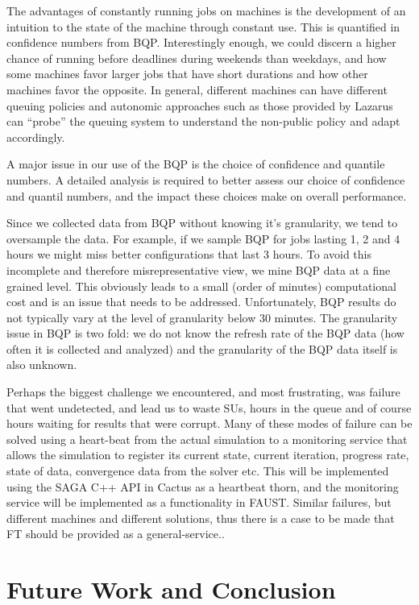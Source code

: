 \documentclass[conference,final]{IEEEtran}
\begin{document}
The advantages of constantly running jobs on machines is the
development of an intuition to the state of the machine through
constant use. This is quantified in confidence numbers from
BQP. Interestingly enough, we could discern a higher chance of running
before deadlines during weekends than weekdays, and how some machines
favor larger jobs that have short durations and how other machines
favor the opposite. In general, different machines can have different
queuing policies and autonomic approaches such as those provided by
Lazarus can ``probe'' the queuing system to understand the non-public
policy and adapt accordingly.

A major issue in our use of the BQP is the choice of confidence and
quantile numbers. A detailed analysis is required to better assess our
choice of confidence and quantil numbers, and the impact these choices
make on overall performance.

Since we collected data from BQP without knowing it's granularity, we
tend to oversample the data. For example, if we sample BQP for jobs
lasting 1, 2 and 4 hours we might miss better configurations that last
3 hours. To avoid this incomplete and therefore misrepresentative
view, we mine BQP data at a fine grained level. This obviously leads
to a small (order of minutes) computational cost and is an issue that
needs to be addressed. Unfortunately, BQP results do not typically
vary at the level of granularity below 30 minutes. The granularity
issue in BQP is two fold: we do not know the refresh rate of
the BQP data (how often it is collected and analyzed) and the granularity
of the BQP data itself is also unknown.

Perhaps the biggest challenge we encountered, and most frustrating,
was failure that went undetected, and lead us to waste SUs, hours in
the queue and of course hours waiting for results that were
corrupt. Many of these modes of failure can be solved using a
heart-beat from the actual simulation to a monitoring service that
allows the simulation to register its current state, current
iteration, progress rate, state of data, convergence data from the
solver etc. This will be implemented using the SAGA C++ API in
Cactus as a heartbeat thorn, and the monitoring service will be
implemented as a functionality in FAUST.  Similar failures,
  but different machines and different solutions, thus there is a case
to be made that FT should be provided as a general-service..


\section{Future Work and Conclusion}
\end{document}
